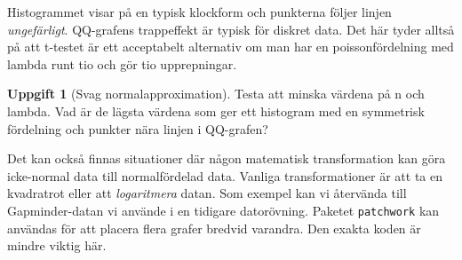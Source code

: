 \documentclass[
]{book}
\theoremstyle{definition}
\theoremstyle{definition}
\theoremstyle{definition}
\newtheorem{exercise}{Uppgift}[chapter]
\theoremstyle{definition}
\theoremstyle{remark}
\begin{document}
Histogrammet visar på en typisk klockform och punkterna följer linjen \emph{ungefärligt}. QQ-grafens trappeffekt är typisk för diskret data. Det här tyder alltså på att t-testet är ett acceptabelt alternativ om man har en poissonfördelning med lambda runt tio och gör tio upprepningar.

\begin{exercise}[Svag normalapproximation]
Testa att minska värdena på n och lambda. Vad är de lägsta värdena som ger ett histogram med en symmetrisk fördelning och punkter nära linjen i QQ-grafen?
\end{exercise}

Det kan också finnas situationer där någon matematisk transformation kan göra icke-normal data till normalfördelad data. Vanliga transformationer är att ta en kvadratrot eller att \emph{logaritmera} datan. Som exempel kan vi återvända till Gapminder-datan vi använde i en tidigare datorövning. Paketet \texttt{patchwork} kan användas för att placera flera grafer bredvid varandra. Den exakta koden är mindre viktig här.
\end{document}
